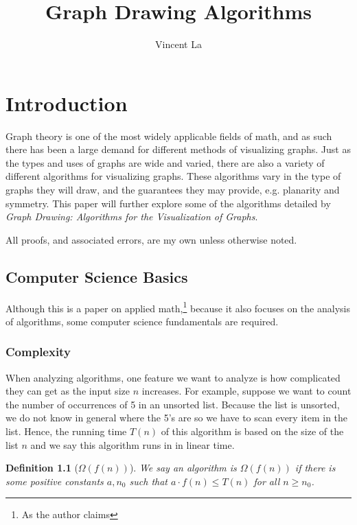 \documentclass[11pt]{report}
\title{Graph Drawing Algorithms}
\author{Vincent La}
\newtheorem{defn}{Definition}[section]
\begin{document}
    
\maketitle
\tableofcontents

\chapter{Introduction}
Graph theory is one of the most widely applicable fields of math, and as such there has been a large demand for different methods of visualizing graphs. Just as the types and uses of graphs are wide and varied, there are also a variety of different algorithms for visualizing graphs. These algorithms vary in the type of graphs they will draw, and the guarantees they may provide, e.g. planarity and symmetry. This paper will further explore some of the algorithms detailed by \textit{Graph Drawing: Algorithms for the Visualization of Graphs}. \cite[see][page 12]{Battista:1998:GDA:551884}

\bigskip

All proofs, and associated errors, are my own unless otherwise noted.

\section{Computer Science Basics}
Although this is a paper on applied math,\footnote{As the author claims} because it also focuses on the analysis of algorithms, some computer science fundamentals are required.
 
\subsection{Complexity}
When analyzing algorithms, one feature we want to analyze is how complicated they can get as the input size $n$ increases. For example, suppose we want to count the number of occurrences of 5 in an unsorted list. Because the list is unsorted, we do not know in general where the 5's are so we have to scan every item in the list. Hence, the running time $T(n)$ of this algorithm is based on the size of the list $n$ and we say this algorithm runs in in linear time.

\begin{defn}[$\Omega(f(n))$] We say an algorithm is $\Omega(f(n))$ if there is some positive constants $a, n_0$ such that $a \cdot f(n) \leq T(n)$ for all $n \geq n_0$.
\end{defn}
\end{document}
